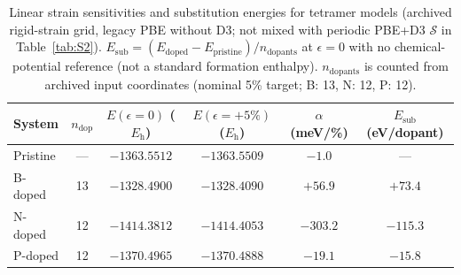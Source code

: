 \begin{table}[t]
\caption{\label{tab:S1}Linear strain sensitivities and substitution energies for tetramer models (archived rigid-strain grid, legacy PBE without D3; not mixed with periodic PBE+D3 $\mathcal{S}$ in Table~\ref{tab:S2}).
$E_{\mathrm{sub}}=(E_{\mathrm{doped}}-E_{\mathrm{pristine}})/n_{\mathrm{dopants}}$ at $\epsilon{=}0$ with no chemical-potential reference (not a standard formation enthalpy).
$n_{\mathrm{dopants}}$ is counted from archived input coordinates (nominal 5\% target; B: 13, N: 12, P: 12).}
\begin{ruledtabular}
\begin{tabular}{lccccc}
System & $n_{\mathrm{dop}}$ & $E(\epsilon{=}0)$ ($E_{\mathrm{h}}$) & $E(\epsilon{=}+5\%)$ ($E_{\mathrm{h}}$) & $\alpha$ (meV/\%) & $E_{\mathrm{sub}}$ (eV/dopant) \\
\hline
Pristine & --- & $-1363.5512$ & $-1363.5509$ & $-1.0$ & --- \\
B-doped & 13 & $-1328.4900$ & $-1328.4090$ & $+56.9$ & $+73.4$ \\
N-doped & 12 & $-1414.3812$ & $-1414.4053$ & $-303.2$ & $-115.3$ \\
P-doped & 12 & $-1370.4965$ & $-1370.4888$ & $-19.1$ & $-15.8$ \\
\end{tabular}
\end{ruledtabular}
\end{table}
